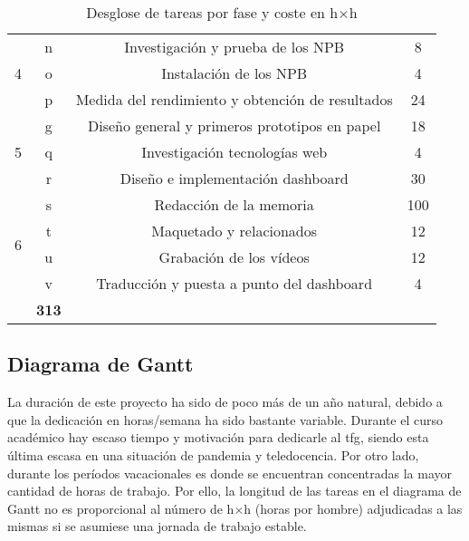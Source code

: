 \begin{table}[htpb]
\begin{tabular}{ |c|c|c|c| }
  \multirow{3}{*}{4}        & n     & {Investigación y prueba de los NPB}                                       & 8 \\\cline{2-4}
                            & o     & {Instalación de los NPB}                                                  & 4 \\\cline{2-4}
                            & p     & {Medida del rendimiento y obtención de resultados}                        & 24 \\
  \hline
  \multirow{3}{*}{5}        & g     & {Diseño general y primeros prototipos en papel}                           & 18 \\\cline{2-4}
                            & q     & {Investigación tecnologías web}                                           & 4 \\\cline{2-4}
                            & r     & {Diseño e implementación dashboard}                                       & 30 \\
  \hline
  \multirow{4}{*}{6}        & s     & {Redacción de la memoria}                                                 & 100 \\\cline{2-4}
                            & t     & {Maquetado y relacionados}                                                & 12 \\\cline{2-4}
                            & u     & {Grabación de los vídeos}                                                 & 12 \\\cline{2-4}
                            & v     & {Traducción y puesta a punto del dashboard}                               & 4 \\
  \hhline{|=|=|=|=|}
  \multicolumn{3}{|c|}{\textbf{Total}}                                                                          & \textbf{313}\\
  \hline
  \end{tabular}
  \caption{Desglose de tareas por fase y coste en h$\times$h}
  \label{tab:desglose_de_tareas}
\end{table}

\subsection{Diagrama de Gantt}
La duración de este proyecto ha sido de poco más de un año natural, debido a que la dedicación en horas/semana ha sido bastante variable. Durante el curso académico hay escaso tiempo y motivación para dedicarle al \acrshort{tfg}, siendo esta última escasa en una situación de pandemia y teledocencia. Por otro lado, durante los períodos vacacionales es donde se encuentran concentradas la mayor cantidad de horas de trabajo. Por ello, la longitud de las tareas en el diagrama de Gantt no es proporcional al número de h$\times$h (horas por hombre) adjudicadas a las mismas si se asumiese una jornada de trabajo estable.

